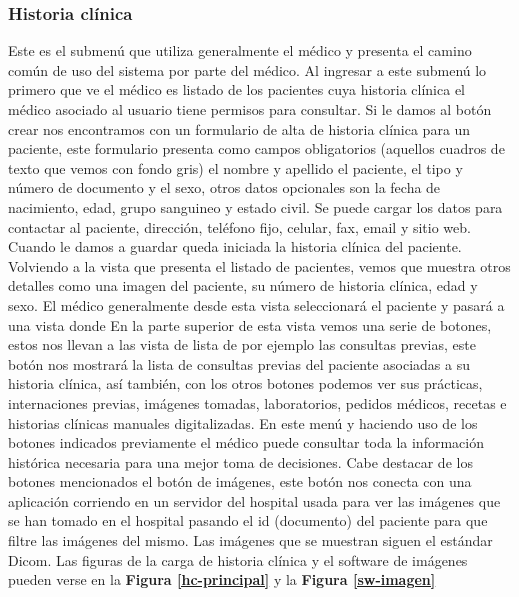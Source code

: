 {\correccionTexto
\subsubsection{Historia clínica}
Este es el submenú que utiliza generalmente el médico y presenta el camino común de uso del sistema por parte del médico. Al ingresar a este submenú lo primero que ve el médico es listado de los pacientes cuya historia clínica el médico asociado al usuario tiene permisos para consultar.
Si le damos al botón crear nos encontramos con un formulario de alta de historia clínica para un paciente, este formulario presenta como campos obligatorios (aquellos cuadros de texto que vemos con fondo gris) el nombre y apellido el paciente, el tipo y número de documento y el sexo, otros datos opcionales son la fecha de nacimiento, edad, grupo sanguineo y estado civil. Se puede cargar los datos para contactar al paciente, dirección, teléfono fijo, celular, fax, email y sitio web. Cuando le damos a guardar queda iniciada la historia clínica del paciente.
Volviendo a la vista que presenta el listado de pacientes, vemos que muestra otros detalles como una imagen del paciente, su número de historia clínica, edad y sexo. El médico generalmente desde esta vista seleccionará el paciente y pasará a una vista donde
En la parte superior de esta vista vemos una serie de botones, estos nos llevan a las vista de lista de por ejemplo las consultas previas, este botón nos mostrará la lista de consultas previas del paciente asociadas a su historia clínica, así también, con los otros botones podemos ver sus prácticas, internaciones previas, imágenes tomadas, laboratorios, pedidos médicos, recetas e historias clínicas manuales digitalizadas. En este menú y haciendo uso de los botones indicados previamente el médico puede consultar toda la información histórica necesaria para una mejor toma de decisiones. 
Cabe destacar de los botones mencionados el botón de imágenes, este botón nos conecta con una aplicación corriendo en un servidor del hospital usada para ver las imágenes que se han tomado en el hospital pasando el id (documento) del paciente para que filtre las imágenes del mismo. Las imágenes que se muestran siguen el estándar Dicom. Las figuras de la carga de historia clínica y el software de imágenes pueden verse en la \textbf{Figura \ref{hc-principal}} y la \textbf{Figura \ref{sw-imagen}}}

